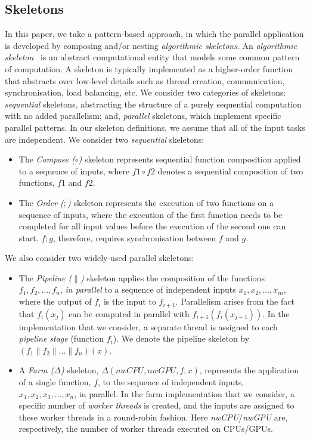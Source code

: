 \documentclass[smallextended]{svjour3}
\begin{document}
\subsection{Skeletons} \label{sec:skeletons}
In this paper, we take a pattern-based approach, in which the parallel application is developed
by composing and/or nesting \emph{algorithmic skeletons}. An \emph{algorithmic skeleton}~\cite{cole-th} is an abstract
computational entity that models some common pattern of computation. %
A skeleton is typically implemented as a higher-order function that abstracts over low-level details such as 
thread creation, communication, synchronisation, load balancing, etc.
We consider two categories of skeletons: \emph{sequential} skeletons, abstracting
the structure of a purely sequential computation with no added parallelism; and, \emph{parallel}
skeletons, which implement specific parallel patterns. In our skeleton definitions, we assume
that all of the input tasks are independent.
We consider two \emph{sequential} skeletons:
\begin{itemize}
\item The \emph{Compose ($\circ$)} skeleton represents sequential
  function composition applied to a sequence of inputs, where
$f1 \circ f2$ denotes a sequential composition of two functions, $f1$ and $f2$.
\item The \emph{Order ($;$)} skeleton represents the execution of two
 functions on a sequence of inputs, where the execution of the first function needs to be
 completed for all input values before the execution of the second one
 can start. $f ; g$, therefore, requires synchronisation
 between $f$ and $g$.
\end{itemize}

We also consider two widely-used parallel skeletons:
\begin{itemize}
\item The \emph{Pipeline ($\parallel$)} skeleton applies
    the composition
    of the functions \\ $f_1, f_2, \dots, f_n$, \emph{in parallel} to a sequence of independent inputs
   $x_1,x_2,\dots,x_m$, where the output of $f_i$ is the input to
   $f_{i+1}$. Parallelism arises from the fact that
   $f_i(x_j)$ can be computed in parallel with
   $f_{i+1}(f_i(x_{j-1}))$. In the implementation that we
   consider, a separate thread is assigned to each
   \emph{pipeline stage} (function $f_i$).
   We denote the pipeline skeleton by
    $(f_1 \parallel f_2 \parallel \dots \parallel f_n)(x) $.
\item A \emph{Farm ($\Delta$)} skeleton,  $\Delta(\mathit{nwCPU},\mathit{nwGPU},f,x)$, represents the application of a single function,
  $f$, to the sequence of independent inputs,\\ 
  $x_1,x_2,x_3,\dots,x_n$, in parallel. In the farm implementation
  that we consider, a specific number of
  \emph{worker threads} is created, and the inputs are assigned to
  these worker threads in a round-robin fashion.  
 Here \emph{nwCPU}/\emph{nwGPU} are, respectively, the number of worker
  threads executed on CPUs/GPUs.
\end{itemize}
\end{document}
